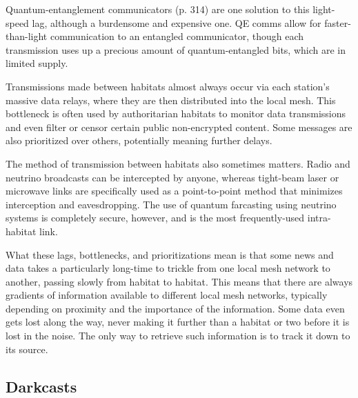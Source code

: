 Quantum-entanglement communicators (p. 314) 
are one solution to this light-speed lag, although a 
burdensome and expensive one. QE comms allow 
for faster-than-light communication to an entangled 
communicator, though each transmission uses up a 
precious amount of quantum-entangled bits, which 
are in limited supply.

Transmissions made between habitats almost 
always occur via each station's massive data relays, 
where they are then distributed into the local mesh. 
This bottleneck is often used by authoritarian habitats 
to monitor data transmissions and even filter or censor 
certain public non-encrypted content. Some messages 
are also prioritized over others, potentially meaning 
further delays.

The method of transmission between habitats also 
sometimes matters. Radio and neutrino broadcasts 
can be intercepted by anyone, whereas tight-beam 
laser or microwave links are specifically used as a 
point-to-point method that minimizes interception 
and eavesdropping. The use of quantum farcasting 
using neutrino systems is completely secure, however, 
and is the most frequently-used intra-habitat link.

What these lags, bottlenecks, and prioritizations 
mean is that some news and data takes a particularly 
long-time to trickle from one local mesh network to 
another, passing slowly from habitat to habitat. This 
means that there are always gradients of information 
available to different local mesh networks, typically 
depending on proximity and the importance of the 
information. Some data even gets lost along the way, 
never making it further than a habitat or two before 
it is lost in the noise. The only way to retrieve such 
information is to track it down to its source.

\subsection{Darkcasts}

